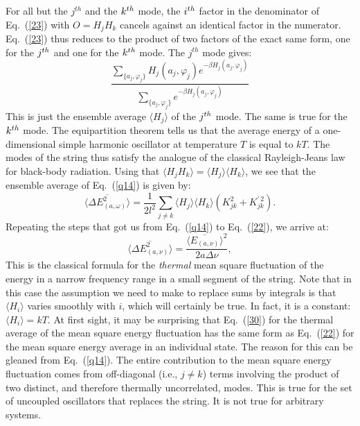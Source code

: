 \documentclass[12pt]{elsart}
\begin{document}
For all but the $j^{th}$ and the $k^{\rm th}$ mode, the $i^{\rm th}$ factor in the denominator of Eq.\ (\ref{23}) with $O=H_j H_k$ cancels against an identical factor in the numerator. Eq.\ (\ref{23}) thus reduces to the product of two factors of the exact same form, one for the $j^{\rm th}$ and one for the $k^{\rm th}$ mode. The $j^{th}$ mode gives:
\begin{equation}
\frac{\displaystyle{\sum_{\{ a_j, \varphi_j\}} H_j(a_j, \varphi_j) e^{- \displaystyle{\beta H_j(a_j, \varphi_j)}}}}{\displaystyle{\sum_{\{ a_j, \varphi_j\}} e^{- \displaystyle{\beta H_j(a_j, \varphi_j)}}}}
\label{27}
\end{equation}
This is just the ensemble average $\langle H_j \rangle$ of the $j^{\rm th}$ mode. The same is true for the $k^{\rm th}$ mode. The equipartition theorem tells us that the average energy of a one-dimensional simple harmonic oscillator at temperature $T$ is equal to $kT$. The modes of the string thus satisfy the analogue of the classical Rayleigh-Jeans law for black-body radiation. Using that $\langle H_j H_k \rangle = \langle H_j  \rangle \langle  H_k \rangle$, we see that the ensemble average of Eq.\ (\ref{q14}) is given by:
\begin{equation}
\langle \overline{\Delta E_{(a, \omega)}^2} \rangle =
 \frac{1}{2l^2} \sum_{j \neq k} \langle H_j \rangle \langle H_k \rangle \left( K^2_{jk} + K^{\prime \, 2}_{jk} \right).
\label{29}
\end{equation}
Repeating the steps that got us from Eq.\ (\ref{q14}) to Eq.\ (\ref{22}), we arrive at:
\begin{equation}
\langle \overline{ \Delta E_{(a, \nu)}^2 } \rangle = 
\frac{ \langle \overline{E_{(a, \nu)} } \rangle^2 }{2a \Delta \nu},
\label{30}
\end{equation}
This is the classical formula for the {\it thermal} mean square fluctuation of the energy in a narrow frequency range in a small segment  of the string. Note that in this case the assumption we need to make to replace sums by integrals is that $\langle H_i \rangle$ varies smoothly with $i$, which will certainly be true. In fact,  it is a constant: $\langle H_i \rangle = kT$. At first sight, it may be surprising that Eq.\ (\ref{30}) for the thermal average of the mean square energy fluctuation has the same form as Eq.\ (\ref{22}) for the mean square energy average in an individual state. The reason for this can be gleaned from Eq.\ (\ref{q14}). The entire
contribution to the mean square energy fluctuation comes from off-diagonal (i.e., $j \neq k$) terms involving the product of two distinct, and therefore thermally uncorrelated, modes. This is true for the set of uncoupled oscillators that replaces the string. It is not true for arbitrary systems.
\end{document}
